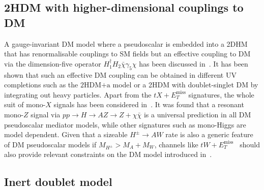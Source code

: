 \documentclass[a4paper, 11pt,notoc]{article}
\newcommand{\MET}{\ensuremath{E_T^\mathrm{miss}}\xspace}
\newcommand{\hdma}{\ensuremath{\textrm{2HDM+a}}\xspace}
\begin{document}
\subsection*{2HDM with  higher-dimensional couplings to DM}

A gauge-invariant DM model where a pseudoscalar is embedded into a 2DHM that has renormalisable couplings to SM fields but an effective coupling to DM via the dimension-five operator $H_1^\dagger H_2 \bar \chi \gamma_5 \chi$ has been  discussed in~\cite{Bauer:2017fsw}. It has been shown that  such an  effective DM coupling can be obtained in different UV completions such as the \hdma model or  a 2HDM with doublet-singlet DM by integrating out heavy particles. Apart from the $t X+\MET$ signatures, the whole suit of mono-$X$ signals has been considered in~\cite{Bauer:2017fsw}. It was found that a resonant mono-$Z$ signal via $pp \to H \to AZ \to  Z + \chi \bar \chi$ is a universal prediction in all DM pseudoscalar mediator models, while other signatures such as mono-Higgs are model dependent. Given that a sizeable $H^\pm \to A W$ rate is also a generic feature of DM pseudoscalar models if $M_{H^\pm} > M_A + M_W$, channels like $tW+\MET$~\cite{Pani:2017qyd} should also  provide relevant constraints on the DM model introduced in~\cite{Bauer:2017fsw}. 

\subsection*{Inert doublet model}
\end{document}
